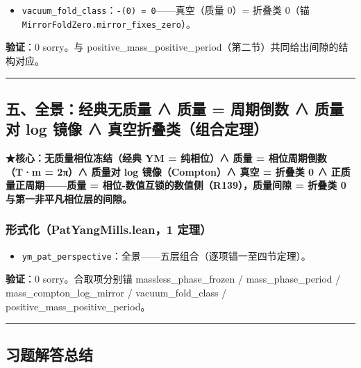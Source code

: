 \documentclass[
]{article}
\providecommand{\tightlist}{%
  \setlength{\itemsep}{0pt}\setlength{\parskip}{0pt}}
\begin{document}
\begin{itemize}
\tightlist
\item
  \texttt{vacuum\_fold\_class}：\texttt{-(0)\ =\ 0}------真空（质量 0）=
  折叠类 0（锚 \texttt{MirrorFoldZero.mirror\_fixes\_zero}）。
\end{itemize}

\textbf{验证}：0 sorry。与
positive\_mass\_positive\_period（第二节）共同给出间隙的结构对应。

\begin{center}\rule{0.5\linewidth}{0.5pt}\end{center}

\subsection{五、全景：经典无质量 ∧ 质量 = 周期倒数 ∧ 质量对 log 镜像 ∧
真空折叠类（组合定理）}\label{ux4e94ux5168ux666fux7ecfux5178ux65e0ux8d28ux91cf-ux8d28ux91cf-ux5468ux671fux5012ux6570-ux8d28ux91cfux5bf9-log-ux955cux50cf-ux771fux7a7aux6298ux53e0ux7c7bux7ec4ux5408ux5b9aux7406}

\textbf{★核心：无质量相位冻结（经典 YM = 纯相位）∧ 质量 =
相位周期倒数（T·m = 2π）∧ 质量对 log 镜像（Compton）∧ 真空 = 折叠类 0 ∧
正质量正周期------质量 = 相位-数值互锁的数值侧（R139），质量间隙 =
折叠类 0 与第一非平凡相位层的间隙。}

\subsubsection{形式化（PatYangMills.lean，1
定理）}\label{ux5f62ux5f0fux5316patyangmills.lean1-ux5b9aux7406-3}

\begin{itemize}
\tightlist
\item
  \texttt{ym\_pat\_perspective}：全景------五层组合（逐项锚一至四节定理）。
\end{itemize}

\textbf{验证}：0 sorry。合取项分别锚 massless\_phase\_frozen /
mass\_phase\_period / mass\_compton\_log\_mirror / vacuum\_fold\_class /
positive\_mass\_positive\_period。

\begin{center}\rule{0.5\linewidth}{0.5pt}\end{center}

\subsection{习题解答总结}\label{ux4e60ux9898ux89e3ux7b54ux603bux7ed3}
\end{document}
